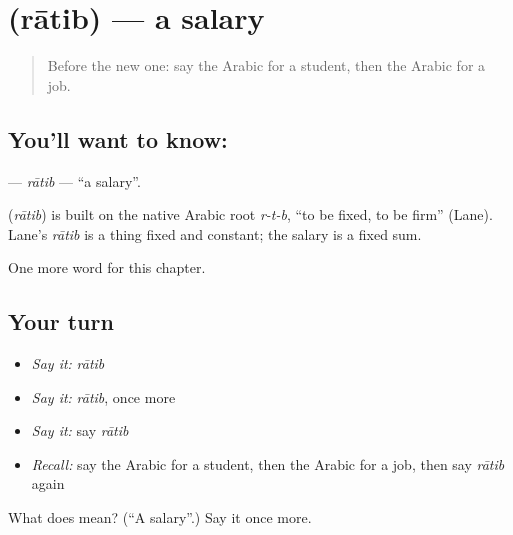 \section[\texorpdfstring{\ar{راتب} (rātib)}{راتب (rātib)}]{ (rātib) — a salary}

\label{lesson:AR-C143-ratib}



\begin{quote}
Before the new one: say the Arabic for a student, then the Arabic for a job.
\end{quote}

\subsection*{You'll want to know: }
\textbf{} — \emph{rātib} — \textquotedblleft{}a salary\textquotedblright{}.

\begin{cousinweb}
\textbf{} (\emph{rātib}) is built on the native Arabic root \emph{r-t-b}, \textquotedblleft{}to be fixed, to be firm\textquotedblright{} (Lane). Lane's \emph{rātib} is a thing fixed and constant; the salary is a fixed sum.
\end{cousinweb}

\begin{grammarlens}[title={What you've built}]
One more word for this chapter.
\end{grammarlens}

\subsection*{Your turn}
\begin{itemize}
\raggedright
  \item \emph{Say it:} \emph{rātib}
  \item \emph{Say it:} \emph{rātib}, once more
  \item \emph{Say it:} say \emph{rātib}
  \item \emph{Recall:} say the Arabic for a student, then the Arabic for a job, then say \emph{rātib} again
\end{itemize}

\begin{tcolorbox}[breakable,colback=teal!4,colframe=teal!35!black,title={Before you move on}]
What does  mean? (\textquotedblleft{}A salary\textquotedblright{}.) Say it once more.
\end{tcolorbox}
